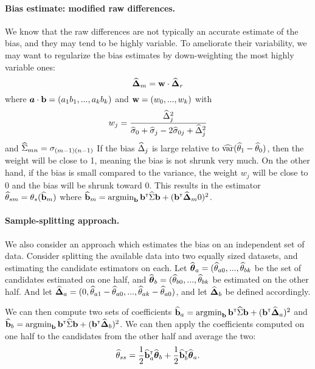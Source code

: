 \documentclass{article}
\begin{document}
\paragraph{Bias estimate: modified raw differences.}
We know that the raw differences are not typically an accurate estimate of the bias, and they may tend to be highly variable. To ameliorate their variability, we may want to regularize the bias estimates by down-weighting the most highly variable ones: 
\[
{\widehat{\boldsymbol{\Delta}}}_m = {\bf w} \cdot {\widehat{\boldsymbol{\Delta}}}_r
\]
where ${\mbox{\boldmath$a$}} \cdot {\bf b} = (a_1b_1, ..., a_kb_k)$ and ${\bf w} = (w_0, ..., w_k)$ with
\[
w_j = \frac{{\widehat\Delta}_j^2}{{\widehat\sigma}_0 + {\widehat\sigma}_j - 2{\widehat\sigma}_{0j} + {\widehat\Delta}_j^2}
\]
and ${\widehat\Sigma}_{mn} = \sigma_{(m-1)(n-1)}$
If the bias ${\widehat\Delta}_j$ is large relative to $\widehat{\mbox{var}}({\widehat\theta}_1 - {\widehat\theta}_0)$, then the weight will be close to 1, meaning the bias is not shrunk very much. On the other hand, if the bias is small compared to the variance, the weight $w_j$ will be close to 0 and the bias will be shrunk toward 0. This results in the estimator ${\widehat\theta}_{sm} = \theta_s({\widehat {{\bf b}}}_m)$ where ${\widehat {{\bf b}}}_m = \mathop{\mbox{argmin}}_{{\bf b}}{\bf b}^{{\sf \scriptscriptstyle{T}}}{\widehat\Sigma}{\bf b} + ({\bf b}^{{\sf \scriptscriptstyle{T}}} {\widehat{\boldsymbol{\Delta}}}_m0)^2$.
\paragraph{Sample-splitting approach.}
We also consider an approach which estimates the bias on an independent set of data. Consider splitting the available data into two equally sized datasets, and estimating the candidate estimators on each. Let ${\widehat{\boldsymbol{\theta}}}_a = ({\widehat\theta}_{a0}, ..., {\widehat\theta}_{bk}$ be the set of candidates estimated on one half, and ${\widehat{\boldsymbol{\theta}}}_b = ({\widehat\theta}_{b0}, ..., {\widehat\theta}_{bk}$ be estimated on the other half. And let ${\widehat{\boldsymbol{\Delta}}}_a = (0, {\widehat\theta}_{a1} - {\widehat\theta}_{a0}, ..., {\widehat\theta}_{ak} - {\widehat\theta}_{a0})$, and let ${\widehat{\boldsymbol{\Delta}}}_b$ be defined accordingly. 

We can then compute two sets of coefficients ${\widehat {{\bf b}}}_a = \mathop{\mbox{argmin}}_{{\bf b}}{\bf b}^{{\sf \scriptscriptstyle{T}}}{\widehat\Sigma}{\bf b} + ({\bf b}^{{\sf \scriptscriptstyle{T}}} {\widehat{\boldsymbol{\Delta}}}_a)^2$ and ${\widehat {{\bf b}}}_b = \mathop{\mbox{argmin}}_{{\bf b}}{\bf b}^{{\sf \scriptscriptstyle{T}}}{\widehat\Sigma}{\bf b} + ({\bf b}^{{\sf \scriptscriptstyle{T}}} {\widehat{\boldsymbol{\Delta}}}_b)^2$. We can then apply the coefficients computed on one half to the candidates from the other half and average the two:
\[
{\widehat\theta}_{ss} = \frac{1}{2}{\widehat {{\bf b}}}_a^{{\sf \scriptscriptstyle{T}}}{\widehat{\boldsymbol{\theta}}}_b + \frac{1}{2}{\widehat {{\bf b}}}_b^{{\sf \scriptscriptstyle{T}}}{\widehat{\boldsymbol{\theta}}}_a.
\]
\end{document}
